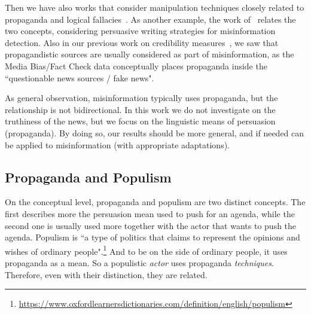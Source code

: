 Then we have also works that consider manipulation techniques closely related to propaganda and logical fallacies~\citep{roozenbeek2022countering}.
As another example, the work of~\citet{romain2022misinformation} relates the two concepts, considering persuasive writing strategies for misinformation detection.
Also in our previous work on credibility measures~\citep{mensio2019news}, %
we saw that propagandistic sources are usually considered as part of misinformation, as the Media Bias/Fact Check data conceptually places propaganda inside the ``questionable news sources / fake news".


As general observation, misinformation typically uses propaganda, but the relationship is not bidirectional. In this work we do not investigate on the truthiness of the news, but we focus on the linguistic means of persuasion (propaganda).
By doing so, our results should be more general, and if needed can be applied to misinformation (with appropriate adaptations). 

\subsection{Propaganda and Populism}
\label{sec:lit_related_populism}

On the conceptual level, propaganda and populism are two distinct concepts. The first describes more the persuasion mean used to push for an agenda, while the second one is usually used more together with the actor that wants to push the agenda. Populism is ``a type of politics that claims to represent the opinions and wishes of ordinary people".\footnote{\url{https://www.oxfordlearnersdictionaries.com/definition/english/populism}}
And to be on the side of ordinary people, it uses propaganda as a mean. So a populistic \emph{actor} uses propaganda \emph{techniques}. Therefore, even with their distinction, they are related.


